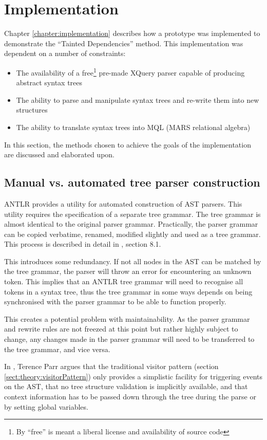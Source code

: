 \section{Implementation}
\label{sect:disc:contextSens}
Chapter \ref{chapter:implementation} describes how a prototype was implemented
to demonstrate the ``Tainted Dependencies'' method. This implementation
was dependent on a number of constraints:
\begin{itemize}
  \item The availability of a free\footnote{By ``free'' is meant a liberal
  license and availability of source code} pre-made XQuery parser capable of
  producing abstract syntax trees
  \item The ability to parse and manipulate syntax trees and re-write them into
  new structures
  \item The ability to translate syntax trees into MQL (MARS relational algebra)
\end{itemize}

In this section, the methods chosen to achieve the goals of the implementation
are discussed and elaborated upon.

\subsection{Manual vs. automated tree parser construction}
ANTLR provides a utility for automated construction of AST parsers. This
utility requires the specification of a separate tree grammar. The tree
grammar is almost identical to the original parser grammar. Practically, the
parser grammar can be copied verbatime, renamed, modified slightly and used as
a tree  grammar. This process is described in detail in \cite{definitiveAntlr},
section 8.1.

This introduces some redundancy. If not all nodes in the AST can be matched by
the tree grammar, the parser will throw an error for encountering an unknown
token. This implies that an ANTLR tree grammar will need to recognise all tokens
in a syntax tree, thus the tree grammar in some ways depends on being
synchronised with the parser grammar to be able to function properly.

This creates a potential problem with maintainability. As the parser grammar and
rewrite rules are not freezed at this point but rather highly subject to
change, any changes made in the parser grammar will need to be transferred to
the tree grammar, and vice versa.

In \cite{translators_should_use_tree_grammars}, Terence Parr argues that the
traditional visitor pattern (section \ref{sect:theory:visitorPattern}) only
provides a simplistic facility for triggering events on the AST, that no tree
structure validation is implicitly available, and that context information has to be
passed down through the tree during the parse or by setting global variables.

